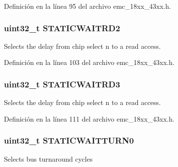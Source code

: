 Definición en la línea 95 del archivo emc\+\_\+18xx\+\_\+43xx.\+h.

\subsubsection[{\texorpdfstring{S\+T\+A\+T\+I\+C\+W\+A\+I\+T\+R\+D2}{STATICWAITRD2}}]{ uint32\+\_\+t S\+T\+A\+T\+I\+C\+W\+A\+I\+T\+R\+D2}\hypertarget{struct_l_p_c___e_m_c___t_a5a1288b3f79119050b00c29914a7d242}{}\label{struct_l_p_c___e_m_c___t_a5a1288b3f79119050b00c29914a7d242}
Selects the delay from chip select n to a read access. 

Definición en la línea 103 del archivo emc\+\_\+18xx\+\_\+43xx.\+h.

\subsubsection[{\texorpdfstring{S\+T\+A\+T\+I\+C\+W\+A\+I\+T\+R\+D3}{STATICWAITRD3}}]{ uint32\+\_\+t S\+T\+A\+T\+I\+C\+W\+A\+I\+T\+R\+D3}\hypertarget{struct_l_p_c___e_m_c___t_ad715b4b5ff9702455975705533281606}{}\label{struct_l_p_c___e_m_c___t_ad715b4b5ff9702455975705533281606}
Selects the delay from chip select n to a read access. 

Definición en la línea 111 del archivo emc\+\_\+18xx\+\_\+43xx.\+h.

\subsubsection[{\texorpdfstring{S\+T\+A\+T\+I\+C\+W\+A\+I\+T\+T\+U\+R\+N0}{STATICWAITTURN0}}]{ uint32\+\_\+t S\+T\+A\+T\+I\+C\+W\+A\+I\+T\+T\+U\+R\+N0}\hypertarget{struct_l_p_c___e_m_c___t_a4bdf208b0c3f6df2ed20a0d765a23d24}{}\label{struct_l_p_c___e_m_c___t_a4bdf208b0c3f6df2ed20a0d765a23d24}
Selects bus turnaround cycles 

